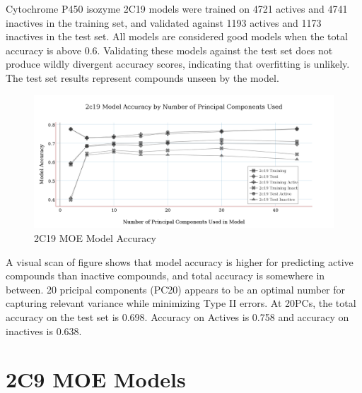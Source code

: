Cytochrome P450 isozyme 2C19 models were trained on 4721 actives and 4741 inactives in the training set, and validated against 1193 actives and 1173 inactives in the test set. All models are considered good models when the  total accuracy is above 0.6. Validating these models against the test set does not produce wildly divergent accuracy scores, indicating that overfitting is unlikely. The test set results represent compounds unseen by the model. 


\begin{figure}[!h]
\includegraphics[width=1\textwidth]{../img/2c19_moe_model_accuracy.png}
\caption{2C19 MOE Model Accuracy}
\end{figure}

A visual scan of figure shows that model accuracy is higher for predicting active compounds than inactive compounds, and total accuracy is somewhere in between. 20 pricipal components (PC20) appears to be an optimal number for capturing relevant variance while minimizing Type II errors. At 20PCs, the total accuracy on the test set is 0.698. Accuracy on Actives is 0.758 and accuracy on inactives is 0.638.


\section{2C9 MOE Models}

